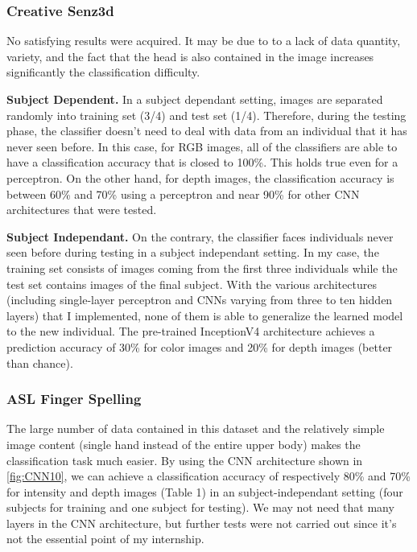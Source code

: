 \subsubsection{Creative Senz3d}

No satisfying results were acquired. It may be due to to a lack of data
quantity, variety, and the fact that the head is also contained in the
image increases significantly the classification difficulty.

\textbf{Subject Dependent.}
In a subject dependant setting, images are separated randomly into
training set (3/4) and test set (1/4). Therefore, during the
testing phase, the classifier doesn't need to deal with data from an
individual that it has never seen before.
In this case, for RGB images, all of the classifiers are able to
have a classification accuracy that is closed to 100\%. This holds true
even for a perceptron.
On the other hand, for depth images, the classification accuracy is
between 60\% and 70\% using a perceptron and near 90\% for other CNN
architectures that were tested.

\textbf{Subject Independant.}
On the contrary, the classifier faces individuals never seen before
during testing in a subject independant setting. 
In my case, the training set consists of images coming from the
first three individuals while the test set contains images of
the final subject.
With the various architectures (including single-layer perceptron
and CNNs varying from three to ten hidden layers)
that I implemented, none of them is able to generalize the learned model
to the new individual.
The pre-trained InceptionV4 architecture achieves a prediction accuracy
of 30\% for color images and 20\% for depth images (better than chance).

\subsubsection{ASL Finger Spelling}

The large number of data contained in this dataset and the relatively
simple image content (single hand instead of the entire upper body)
makes the classification task much easier. By using the CNN architecture
shown in \autoref{fig:CNN10}, we can achieve a classification accuracy
of respectively 80\% and 70\% for intensity and depth images (Table 1)
in an subject-independant setting (four subjects for training and one
subject for testing). We may not need that many layers in the CNN
architecture, but further tests were not carried out since it's not
the essential point of my internship.

